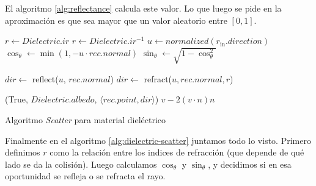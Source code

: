 El algoritmo \ref{alg:reflectance} calcula este valor. Lo que luego se pide en
la aproximación es que sea mayor que un valor aleatorio entre $[0, 1]$.

\begin{algorithm}[H]
\begin{algorithmic}[1]
    \State $r \gets Dielectric.ir$
        \State $r \gets Dielectric.ir^{-1}$
    \EndIf
    \State $u \gets normalized(r_{\text{in}}.direction)$
    \State $\cos_{\theta} \gets \min(1, -u \cdot rec.normal)$
    \State $\sin_{\theta} \gets \sqrt{1 - \cos_{\theta}^2}$

        \State $dir \gets$ reflect($u$, $rec.normal$)
    \Else
        \State $dir \gets$ refract($u, rec.normal, r$)
    \EndIf

    \State \Return (True, $Dielectric.albedo$, $\langle rec.point, dir \rangle$)
\EndFunction
{}
    \State \Return $v - 2 (v \cdot n) n$
\EndFunction
\end{algorithmic}
\caption{Algoritmo \textit{Scatter} para material dieléctrico}
\label{alg:dielectric-scatter}
\end{algorithm}

Finalmente en el algoritmo \ref{alg:dielectric-scatter} juntamos todo lo visto.
Primero definimos $r$ como la relación entre los indices de refracción (que
depende de qué lado se da la colisión). Luego calculamos $\cos_{\theta}$ y
$\sin_{\theta}$, y decidimos si en esa oportunidad se refleja o se refracta el
rayo.
